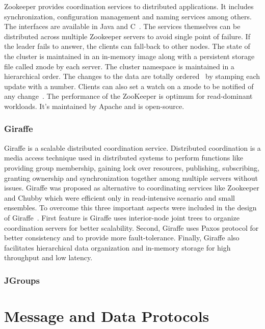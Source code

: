 Zookeeper provides coordination services to distributed applications.
It includes synchronization, configuration management and naming
services among others. The interfaces are available in Java and
C~\cite{www-zoo-overiew}. The services themselves can be distributed
across multiple Zookeeper servers to avoid single point of failure.
If the leader fails to answer, the clients can fall-back to other
nodes. The state of the cluster is maintained in an in-memory image
along with a persistent storage file called znode by each server. The
cluster namespace is maintained in a hierarchical order. The changes
to the data are totally ordered~\cite{www-zoo-wiki} by stamping each
update with a number. Clients can also set a watch on a znode to be
notified of any change~\cite{www-zoo-ibm}. The performance of the
ZooKeeper is optimum for read-dominant workloads. It's maintained by
Apache and is open-source.

\subsubsection{Giraffe}

Giraffe is a scalable distributed coordination service. Distributed
coordination is a media access technique used in distributed systems
to perform functions like providing group membership, gaining lock
over resources, publishing, subscribing, granting ownership and
synchronization together among multiple servers without
issues. Giraffe was proposed as alternative to coordinating services
like Zookeeper and Chubby which were efficient only in read-intensive
scenario and small ensembles. To overcome this three important aspects
were included in the design of Giraffe~\cite{giraffePaper}. First
feature is Giraffe uses interior-node joint trees to organize
coordination servers for better scalability. Second, Giraffe uses
Paxos protocol for better consistency and to provide more
fault-tolerance. Finally, Giraffe also facilitates hierarchical data
organization and in-memory storage for high throughput and low
latency.
     
\subsubsection{JGroups}

\section{Message and Data Protocols}
\label{S:o-protocols}


